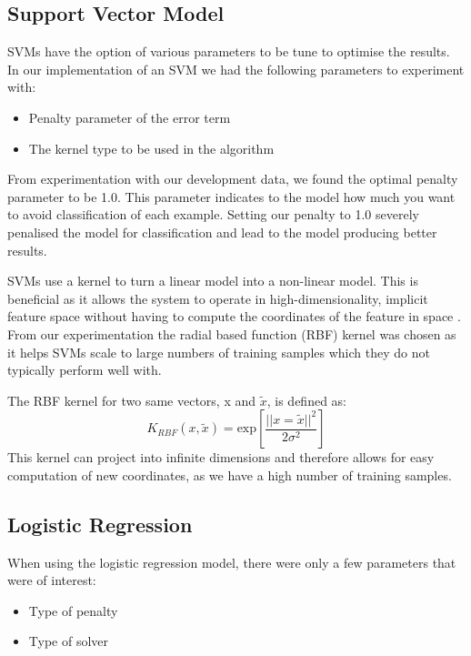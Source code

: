 \documentclass[bsc,frontabs,twoside,singlespacing,parskip,deptreport]{infthesis}     %
\begin{document}
 \subsection{Support Vector Model}
 SVMs have the option of various parameters to be tune to optimise the results.
 In our implementation of an SVM we had the following parameters to experiment with:
 \begin{itemize}
 \item Penalty parameter of the error term
 \item The kernel type to be used in the algorithm
 \end{itemize}

 From experimentation with our development data, we found the optimal penalty parameter to be 1.0.
 This parameter indicates to the model how much you want to avoid classification of each example.
 Setting our penalty to 1.0 severely penalised the model for classification and lead to the model producing
 better results.

 SVMs use a kernel to turn a linear model into a non-linear model. This is beneficial as it allows the system
 to operate in high-dimensionality, implicit feature space without having to compute the coordinates of the feature
 in space \cite{hofmann2008kernel}.
 From our experimentation the radial based function (RBF) kernel was chosen as it helps SVMs scale to large numbers of
 training samples which they do not typically perform well with.

 The RBF kernel for two same vectors, x and $\tilde{x}$, is defined as:
 \begin{equation}
   K_{RBF} (x, \tilde{x}) = \text{exp}[ \frac{||x =\tilde{x}||^2}{2\sigma^2}]\nonumber
 \end{equation}
\cite{hofmann2008kernel}
 This kernel can project into infinite dimensions and therefore allows for easy computation of new coordinates, as
 we have a high number of training samples.
 
 \subsection{Logistic Regression}\label{sec:log-reg}
 When using the logistic regression model, there were only a few parameters that were of interest:
 \begin{itemize}
   \item Type of penalty
   \item Type of solver
 \end{itemize}
\end{document}
